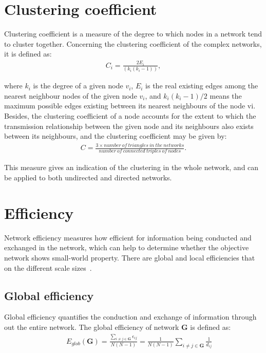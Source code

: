 \section{Clustering coefficient} %
Clustering coefficient is a measure of the degree to which nodes in a network tend to cluster together. Concerning the clustering coefficient of the complex networks, it is defined as:
\begin{eqnarray}
C_i=\frac{2E_i}{(k_i(k_i-1))},
\end{eqnarray}

where $k_i$ is the degree of a given node $v_i$, $E_i$ is the real existing edges among the nearest neighbour nodes of the given node $v_i$, and $k_i(k_i-1)/2$ means the maximum possible edges existing between its nearest neighbours of the node vi. Besides, the clustering coefficient of a node accounts for the extent to which the transmission relationship between the given node and its neighbours also exists between its neighbours, and the clustering coefficient may be given by:
\begin{eqnarray}
C=\frac{3\times number\ of\ triangles\ in\ the\ networks}{number\ of\ connected\ triples\ of\ nodes}.
\end{eqnarray}

This measure gives an indication of the clustering in the whole network, and can be applied to both undirected and directed networks.

\section{Efficiency}
Network efficiency measures how efficient for information being conducted and exchanged in the network, which can help to determine whether the objective network shows small-world property. There are global and local efficiencies that on the different scale sizes~\cite{latora2001efficient}.

\subsection{Global efficiency}
Global efficiency quantifies the conduction and exchange of information through out the entire network. The global efficiency of network \textbf{G} is defined as:
\begin{eqnarray}
&&E_{glob}(\textbf{G})=\frac{\sum_{i \neq j \in \textbf{G}} \epsilon_{ij}}{N(N-1)}=\frac{1}{N(N-1)}\sum_{i \neq j \in \textbf{G}} \frac{1}{d_{ij}}
\end{eqnarray}

